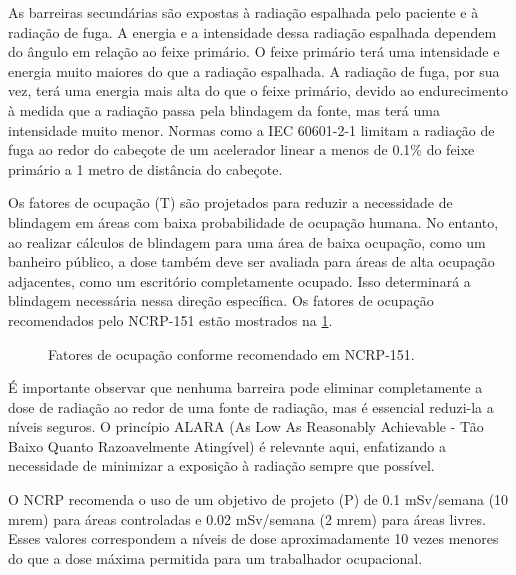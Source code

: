 \documentclass[11pt,a4paper]{article}
\begin{document}
	As barreiras secundárias são expostas à radiação espalhada pelo paciente e à radiação de fuga. A energia e a intensidade dessa radiação espalhada dependem do ângulo em relação ao feixe primário. O feixe primário terá uma intensidade e energia muito maiores do que a radiação espalhada. A radiação de fuga, por sua vez, terá uma energia mais alta do que o feixe primário, devido ao endurecimento à medida que a radiação passa pela blindagem da fonte, mas terá uma intensidade muito menor. Normas como a IEC 60601-2-1 limitam a radiação de fuga ao redor do cabeçote de um acelerador linear a menos de 0.1\% do feixe primário a 1 metro de distância do cabeçote.

	Os fatores de ocupação (T) são projetados para reduzir a necessidade de blindagem em áreas com baixa probabilidade de ocupação humana. No entanto, ao realizar cálculos de blindagem para uma área de baixa ocupação, como um banheiro público, a dose também deve ser avaliada para áreas de alta ocupação adjacentes, como um escritório completamente ocupado. Isso determinará a blindagem necessária nessa direção específica. Os fatores de ocupação recomendados pelo NCRP-151 estão mostrados na \ref{fig:prFatorOcupacao}.

	\begin{figure}[!h]
		\centering
		\caption{Fatores de ocupação conforme recomendado em NCRP-151.}
		\label{fig:prFatorOcupacao}
	\end{figure}

	É importante observar que nenhuma barreira pode eliminar completamente a dose de radiação ao redor de uma fonte de radiação, mas é essencial reduzi-la a níveis seguros. O princípio ALARA (As Low As Reasonably Achievable - Tão Baixo Quanto Razoavelmente Atingível) é relevante aqui, enfatizando a necessidade de minimizar a exposição à radiação sempre que possível. 
	
	O NCRP recomenda o uso de um objetivo de projeto (P) de 0.1 mSv/semana (10 mrem) para áreas controladas e 0.02 mSv/semana (2 mrem) para áreas livres. Esses valores correspondem a níveis de dose aproximadamente 10 vezes menores do que a dose máxima permitida para um trabalhador ocupacional.
\end{document}
